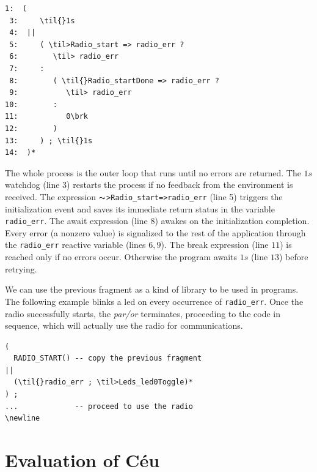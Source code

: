 \documentclass{sig-alternate-ipsn09}
\newcommand{\2}{\;\;}
\newcommand{\5}{\;\;\;\;\;}
\newcommand{\til}{$\thicksim$}
\newcommand{\brk}{\textbf{\small{$^\wedge$}}}
\newcommand{\code}[1] {{\small{\texttt{#1}}}}
\begin{document}
\begin{Verbatim}[commandchars=\\\{\}]
 1:  (
 3:     \til{}1s
 4:  ||
 5:     ( \til>Radio_start => radio_err ?
 6:        \til> radio_err
 7:     :
 8:        ( \til{}Radio_startDone => radio_err ?
 9:           \til> radio_err
10:        :
11:           0\brk
12:        )
13:     ) ; \til{}1s
14:  )*
\end{Verbatim}

The whole process is the outer loop that runs until no errors are returned.
The $1s$ watchdog (line $3$) restarts the process if no feedback from the 
environment is received.
The expression \code{\til>Radio\_start=>radio\_err} (line 5) triggers the 
initialization event and saves its immediate return status in the variable 
\code{radio\_err}.
The await expression (line 8) awakes on the initialization completion.
Every error (a nonzero value) is signalized to the rest of the application 
through the \code{radio\_err} reactive variable (lines $6,9$).
The break expression (line $11$) is reached only if no errors occur.
Otherwise the program awaits $1s$ (line $13$) before retrying.

We can use the previous fragment as a kind of library to be used in programs.
The following example blinks a led on every occurrence of \code{radio\_err}.
Once the radio successfully starts, the \emph{par/or} terminates, proceeding to 
the code in sequence, which will actually use the radio for communications.


\begin{Verbatim}[commandchars=\\\{\}]
(
  RADIO_START() -- copy the previous fragment
||
  (\til{}radio_err ; \til>Leds_led0Toggle)*
) ;
...             -- proceed to use the radio
\newline
\end{Verbatim}

\section{Evaluation of C\'eu}
\label{sec:eval}
\end{document}
